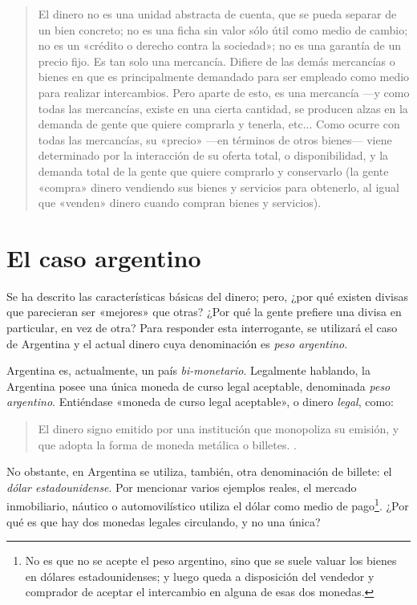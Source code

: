 \documentclass[12pt,a4paper,twoside]{book}
\begin{document}
\begin{quotation}
El dinero no es una unidad abstracta de cuenta, que se pueda separar de un bien concreto; no es una ficha sin valor sólo útil como medio de cambio; no es un «crédito o derecho contra la sociedad»; no es una garantía de un precio fijo. Es tan solo una mercancía. Difiere de las demás mercancías o bienes en que es principalmente demandado para ser empleado como medio para realizar intercambios. Pero aparte de esto, es una mercancía —y como todas las mercancías, existe en una cierta cantidad, se producen alzas en la demanda de gente que quiere comprarla y tenerla, etc... Como ocurre con todas las mercancías, su «precio» —en términos de otros bienes— viene determinado por la interacción de su oferta total, o disponibilidad, y la demanda total de la gente que quiere comprarlo y conservarlo (la gente «compra» dinero vendiendo sus bienes y servicios para obtenerlo, al igual que «venden» dinero cuando compran bienes y servicios). \cite[pág. 11]{rothbard:dinero}
\end{quotation}

\chapter{El caso argentino}
Se ha descrito las características básicas del dinero; pero, ¿por qué existen divisas que parecieran ser «mejores» que otras? ¿Por qué la gente prefiere una divisa en particular, en vez de otra? Para responder esta interrogante, se utilizará el caso de Argentina y el actual dinero cuya denominación es \textit{peso argentino}.

Argentina es, actualmente, un país \textit{bi-monetario}. Legalmente hablando, la Argentina posee una única moneda de curso legal aceptable, denominada \textit{peso argentino}. Entiéndase «moneda de curso legal aceptable», o dinero \textit{legal}, como:

\begin{quotation}
El dinero signo emitido por una institución que monopoliza su emisión, y que adopta la forma de moneda metálica o billetes. \cite[pág. 267]{mochobeker}.
\end{quotation}

No obstante, en Argentina se utiliza, también, otra denominación de billete: el \textit{dólar estadounidense}. Por mencionar varios ejemplos reales, el mercado inmobiliario, náutico o automovilístico utiliza el dólar como medio de pago\footnote{No es que no se acepte el peso argentino, sino que se suele valuar los bienes en dólares estadounidenses; y luego queda a disposición del vendedor y comprador de aceptar el intercambio en alguna de esas dos monedas.}. ¿Por qué es que hay dos monedas legales circulando, y no una única?
\end{document}
